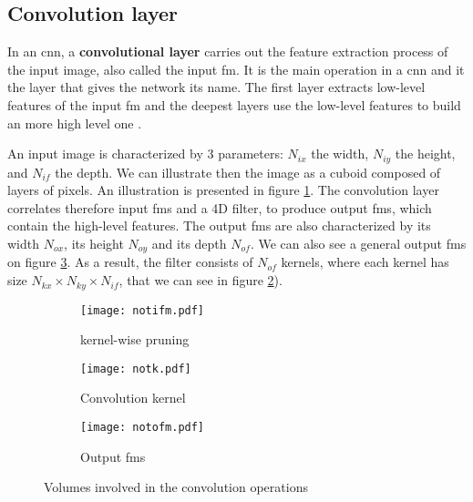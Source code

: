 \subsection{Convolution layer} \label{subs:2dconv}
In an \acrshort{cnn}, a \textbf{convolutional layer} carries out the feature extraction process of the input image, also called the input \acrfull{fm}. It is the main operation in a \acrshort{cnn} and it the layer that gives the network its name. The first layer extracts low-level features of the input \acrshort{fm} and the deepest layers use the low-level features to build an more high level one \cite{goodfellow_deep_2016}.

An input image is characterized by 3 parameters: \textbf{$N_{ix}$} the width, \textbf{$N_{iy}$} the height, and \textbf{$N_{if}$} the depth. We can illustrate then the image as a cuboid composed of layers of pixels. An illustration is presented in figure \ref{fig:notation:ifm}.
The convolution layer correlates therefore input \acrshort{fm}s and a 4D filter, to produce output \acrshort{fm}s, which contain the high-level features. The output \acrshort{fm}s are also characterized by its width $N_{ox}$, its height $N_{oy}$ and its depth $N_{of}$. We can also see a general output \acrshort{fm}s on figure \ref{fig:notation:ofm}. As a result, the filter consists of $N_{of}$ kernels, where each kernel has size $N_{kx} \times N_{ky} \times N_{if}$, that we can see in figure \ref{fig:notation:k}).
%
\begin{figure}
    \centering
    \begin{subfigure}{.32\textwidth}
    \centering
    \texttt{[image: notifm.pdf]}
    \caption{kernel-wise pruning}
    \label{fig:notation:ifm}
    \end{subfigure}
    \begin{subfigure}{.32\textwidth}
    \centering
    \texttt{[image: notk.pdf]}
    \caption{Convolution kernel}
    \label{fig:notation:k}
    \end{subfigure}
    \begin{subfigure}{.32\textwidth}
    \centering
    \texttt{[image: notofm.pdf]}
    \caption{Output \acrshort{fm}s}
    \label{fig:notation:ofm}
    \end{subfigure}
    \caption{Volumes involved in the convolution operations}
    \label{fig:notconv}
\end{figure}


